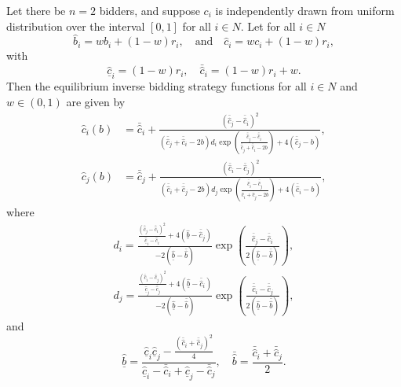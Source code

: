 \begin{proposition}
\label{prop:inverse_equi_bidding_str}
Let there be $n=2$ bidders, and suppose $c_i$ is independently drawn from uniform distribution over the interval $[0,1]$ for all $i\in N$. Let for all $i\in N$
\begin{equation*}
  \hat{b}_i = wb_i + (1-w)r_i,\quad\text{and}\quad \hat{c}_i = wc_i + (1-w)r_i,
\end{equation*}
with
\begin{equation}
  \label{eq:cost_hat_bounds}
  \underline{\hat{c}}_i = (1-w)r_i,\quad \bar{\hat{c}}_i = (1-w)r_i + w.
\end{equation}
Then the equilibrium inverse bidding strategy functions for all $i\in N$ and $w\in (0,1)$ are given by
\begin{align}
  \label{eq:inverse_equi_bidding_str_i}
  \hat{c}_i(b) &= \bar{\hat{c}}_i + \frac{(\bar{\hat{c}}_j - \bar{\hat{c}}_i)^2}{(\bar{\hat{c}}_j + \bar{\hat{c}}_i - 2b)d_i \exp{\left(\displaystyle\frac{\bar{\hat{c}}_j - \bar{\hat{c}}_i}{\bar{\hat{c}}_j + \bar{\hat{c}}_i - 2b}\right)} + 4(\bar{\hat{c}}_j - b)},\\[2ex]
  \label{eq:inverse_equi_bidding_str_j}
  \hat{c}_j(b) &= \bar{\hat{c}}_j + \frac{(\bar{\hat{c}}_i - \bar{\hat{c}}_j)^2}{(\bar{\hat{c}}_i + \bar{\hat{c}}_j - 2b)d_j \exp{\left(\displaystyle\frac{\bar{\hat{c}}_i - \bar{\hat{c}}_j}{\bar{\hat{c}}_i + \bar{\hat{c}}_j - 2b}\right)} + 4(\bar{\hat{c}}_i - b)},
\end{align}
where
\begin{align}
  \label{eq:constant_d_i}
  d_i = \frac{\displaystyle\frac{(\bar{\hat{c}}_j - \bar{\hat{c}}_i)^2}{\underline{\hat{c}}_i - \bar{\hat{c}}_i} + 4(\underline{\hat{b}} - \bar{\hat{c}}_j)}{-2(\underline{\hat{b}} - \bar{\hat{b}})} \exp{\left(\displaystyle\frac{\bar{\hat{c}}_j - \bar{\hat{c}}_i}{2(\underline{\hat{b}} - \bar{\hat{b}})}\right)}, \\[2ex]
  \label{eq:constant_d_j}
  d_j = \frac{\displaystyle\frac{(\bar{\hat{c}}_i - \bar{\hat{c}}_j)^2}{\underline{\hat{c}}_j - \bar{\hat{c}}_j} + 4(\underline{\hat{b}} - \bar{\hat{c}}_i)}{-2(\underline{\hat{b}} - \bar{\hat{b}})} \exp{\left(\frac{\bar{\hat{c}}_i - \bar{\hat{c}}_j}{2(\underline{\hat{b}} - \bar{\hat{b}})}\right)},
\end{align}
and
\begin{equation}
  \label{eq:bid_bounds}
  \underline{\hat{b}} = \frac{\underline{\hat{c}}_i\underline{\hat{c}}_j - \displaystyle\frac{(\bar{\hat{c}}_i + \bar{\hat{c}}_j)^2}{4}}{\underline{\hat{c}}_i - \bar{\hat{c}}_i + \underline{\hat{c}}_j - \bar{\hat{c}}_j},\quad
  \bar{\hat{b}} = \frac{\bar{\hat{c}}_i + \bar{\hat{c}}_j}{2}.
\end{equation}
\end{proposition}
